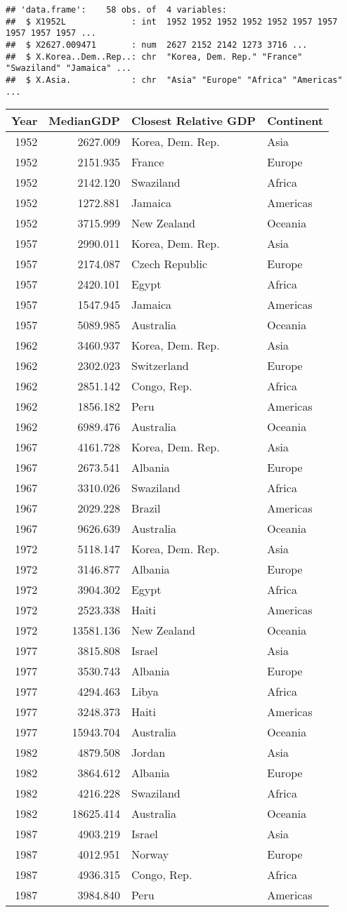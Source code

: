 \documentclass[
]{article}
\begin{document}
\begin{verbatim}
## 'data.frame':    58 obs. of  4 variables:
##  $ X1952L             : int  1952 1952 1952 1952 1952 1957 1957 1957 1957 1957 ...
##  $ X2627.009471       : num  2627 2152 2142 1273 3716 ...
##  $ X.Korea..Dem..Rep..: chr  "Korea, Dem. Rep." "France" "Swaziland" "Jamaica" ...
##  $ X.Asia.            : chr  "Asia" "Europe" "Africa" "Americas" ...
\end{verbatim}

\begin{longtable}[]{@{}rrll@{}}
\toprule
Year & MedianGDP & Closest Relative GDP & Continent\tabularnewline
\midrule
\endhead
1952 & 2627.009 & Korea, Dem. Rep. & Asia\tabularnewline
1952 & 2151.935 & France & Europe\tabularnewline
1952 & 2142.120 & Swaziland & Africa\tabularnewline
1952 & 1272.881 & Jamaica & Americas\tabularnewline
1952 & 3715.999 & New Zealand & Oceania\tabularnewline
1957 & 2990.011 & Korea, Dem. Rep. & Asia\tabularnewline
1957 & 2174.087 & Czech Republic & Europe\tabularnewline
1957 & 2420.101 & Egypt & Africa\tabularnewline
1957 & 1547.945 & Jamaica & Americas\tabularnewline
1957 & 5089.985 & Australia & Oceania\tabularnewline
1962 & 3460.937 & Korea, Dem. Rep. & Asia\tabularnewline
1962 & 2302.023 & Switzerland & Europe\tabularnewline
1962 & 2851.142 & Congo, Rep. & Africa\tabularnewline
1962 & 1856.182 & Peru & Americas\tabularnewline
1962 & 6989.476 & Australia & Oceania\tabularnewline
1967 & 4161.728 & Korea, Dem. Rep. & Asia\tabularnewline
1967 & 2673.541 & Albania & Europe\tabularnewline
1967 & 3310.026 & Swaziland & Africa\tabularnewline
1967 & 2029.228 & Brazil & Americas\tabularnewline
1967 & 9626.639 & Australia & Oceania\tabularnewline
1972 & 5118.147 & Korea, Dem. Rep. & Asia\tabularnewline
1972 & 3146.877 & Albania & Europe\tabularnewline
1972 & 3904.302 & Egypt & Africa\tabularnewline
1972 & 2523.338 & Haiti & Americas\tabularnewline
1972 & 13581.136 & New Zealand & Oceania\tabularnewline
1977 & 3815.808 & Israel & Asia\tabularnewline
1977 & 3530.743 & Albania & Europe\tabularnewline
1977 & 4294.463 & Libya & Africa\tabularnewline
1977 & 3248.373 & Haiti & Americas\tabularnewline
1977 & 15943.704 & Australia & Oceania\tabularnewline
1982 & 4879.508 & Jordan & Asia\tabularnewline
1982 & 3864.612 & Albania & Europe\tabularnewline
1982 & 4216.228 & Swaziland & Africa\tabularnewline
1982 & 18625.414 & Australia & Oceania\tabularnewline
1987 & 4903.219 & Israel & Asia\tabularnewline
1987 & 4012.951 & Norway & Europe\tabularnewline
1987 & 4936.315 & Congo, Rep. & Africa\tabularnewline
1987 & 3984.840 & Peru & Americas\tabularnewline

\end{longtable}
\end{document}
